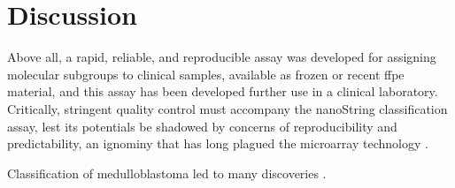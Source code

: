 \section{Discussion}

Above all, a rapid, reliable, and reproducible assay was developed for assigning molecular subgroups to clinical samples, available as frozen or recent \gls{ffpe} material, and this assay has been developed further use in a clinical laboratory. Critically, stringent quality control must accompany the nanoString classification assay, lest its potentials be shadowed by concerns of reproducibility and predictability, an ignominy that has long plagued the microarray technology .

Classification of medulloblastoma led to many discoveries .

\clearpage
